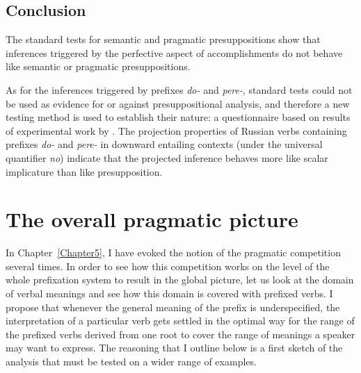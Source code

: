 \subsection{Conclusion}
The standard tests for semantic and pragmatic presuppositions show that inferences triggered by the perfective aspect of accomplishments do not behave like semantic or pragmatic presuppositions.

As for the inferences triggered by prefixes \textit{do-} and \textit{pere-}, standard tests could not be used as evidence for or against presuppositional analysis, and therefore a new testing method is used to establish their nature: a questionnaire based on results of experimental work by \citet{Chemla:09}.
The projection properties of Russian verbs containing prefixes \textit{do-} and \textit{pere-} in downward entailing contexts (under the universal quantifier \textit{no}) indicate that the projected inference behaves more like scalar implicature than like presupposition.


\section{The overall pragmatic picture}\label{section:pragm:overall}
In Chapter~\ref{Chapter5}, I have evoked the notion of the pragmatic competition several times. In order to see how this competition works on the level of the whole prefixation system to result in the global picture, let us look at the domain of verbal meanings and see how this domain is covered with prefixed verbs. I propose that whenever the general meaning of the prefix is underspecified, the interpretation of a particular verb gets settled in the optimal way for the range of the prefixed verbs derived from one root to cover the range of meanings a speaker may want to express. The reasoning that I outline below is a first sketch of the analysis that must be tested on a wider range of examples.

